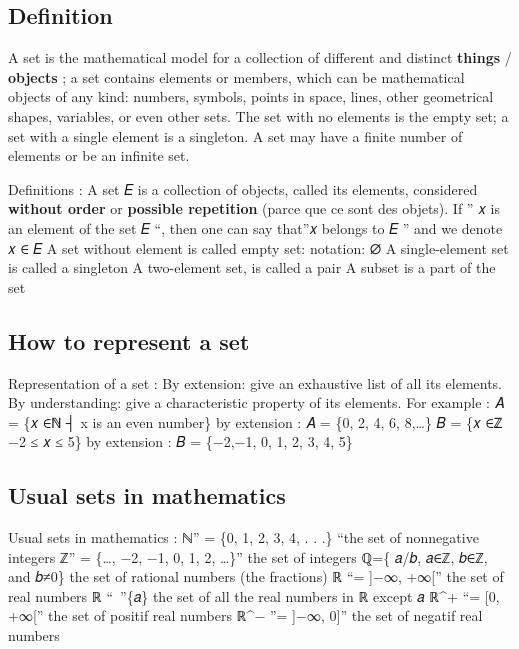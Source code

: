 \documentclass[
  letterpaper,
  DIV=11,
  numbers=noendperiod]{scrreprt}
\begin{document}
\subsection{Definition}\label{definition}

A set is the mathematical model for a collection of different and
distinct \textbf{things} / \textbf{objects} ; a set contains elements or
members, which can be mathematical objects of any kind: numbers,
symbols, points in space, lines, other geometrical shapes, variables, or
even other sets. The set with no elements is the empty set; a set with a
single element is a singleton. A set may have a finite number of
elements or be an infinite set.

Definitions : A set 𝐸 is a collection of objects, called its elements,
considered \textbf{without order} or \textbf{possible repetition} (parce
que ce sont des objets). If '' 𝑥 is an element of the set 𝐸 ``, then one
can say that''𝑥 belongs to 𝐸 '' and we denote 𝑥 ∈ 𝐸 A set without
element is called empty set: notation: ∅ A single-element set is called
a singleton A two-element set, is called a pair A subset is a part of
the set

\subsection{How to represent a set}\label{how-to-represent-a-set}

Representation of a set : By extension: give an exhaustive list of all
its elements. By understanding: give a characteristic property of its
elements. For example : 𝐴 = \{𝑥 ∈ℕ ┤\textbar{} x is an even number\} by
extension : 𝐴 = \{0, 2, 4, 6, 8,\ldots\} 𝐵 = \{𝑥 ∈ℤ \textbar{} −2 ≤ 𝑥 ≤
5\} by extension : 𝐵 = \{−2,−1, 0, 1, 2, 3, 4, 5\}

\subsection{Usual sets in mathematics}\label{usual-sets-in-mathematics}

Usual sets in mathematics : ℕ'' = \{0, 1, 2, 3, 4, . . .\} ``the set of
nonnegative integers ℤ'' = \{\ldots, −2, −1, 0, 1, 2, \ldots\}'' the set
of integers ℚ=\{ 𝑎/𝑏, 𝑎∈ℤ, 𝑏∈ℤ, and 𝑏≠0\} the set of rational numbers
(the fractions) ℝ ``= {]}−∞, +∞{[}'' the set of real numbers ℝ
``~''\{𝑎\} the set of all the real numbers in ℝ except 𝑎 ℝ\^{}+ ``=
{[}0, +∞{[}'' the set of positif real numbers ℝ\^{}− ''= {]}−∞, 0{]}''
the set of negatif real numbers
\end{document}
